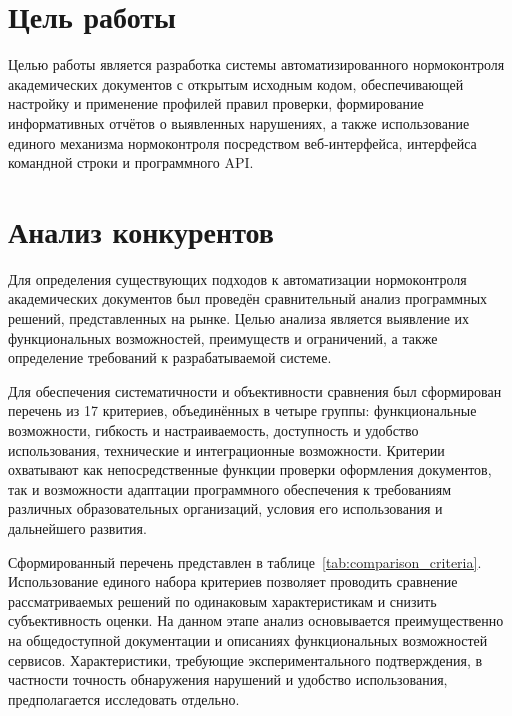 \documentclass[a4paper,14pt]{extarticle}
\begin{document}
\section{Цель работы}
Целью работы является разработка системы автоматизированного нормоконтроля академических документов с открытым исходным кодом,
обеспечивающей настройку и применение профилей правил проверки, формирование информативных отчётов о выявленных нарушениях,
а также использование единого механизма нормоконтроля посредством веб-интерфейса, интерфейса командной строки и программного API.

\section{Анализ конкурентов}
Для определения существующих подходов к автоматизации нормоконтроля академических документов был проведён сравнительный анализ программных решений, представленных на рынке. Целью анализа является выявление их функциональных возможностей, преимуществ и ограничений, а также определение требований к разрабатываемой системе.

Для обеспечения систематичности и объективности сравнения был сформирован перечень из 17 критериев, объединённых в четыре группы: функциональные возможности, гибкость и настраиваемость, доступность и удобство использования, технические и интеграционные возможности. Критерии охватывают как непосредственные функции проверки оформления документов, так и возможности адаптации программного обеспечения к требованиям различных образовательных организаций, условия его использования и дальнейшего развития.

Сформированный перечень представлен в таблице~\ref{tab:comparison_criteria}. Использование единого набора критериев позволяет проводить сравнение рассматриваемых решений по одинаковым характеристикам и снизить субъективность оценки. На данном этапе анализ основывается преимущественно на общедоступной документации и описаниях функциональных возможностей сервисов. Характеристики, требующие экспериментального подтверждения, в частности точность обнаружения нарушений и удобство использования, предполагается исследовать отдельно.


\begingroup

\newlength{\criteriaTableWidth}
\setlength{\criteriaTableWidth}{
    \dimexpr
    1cm + 4.2cm + 8cm
    + 6\tabcolsep
    + 4\arrayrulewidth
    \relax
}
\end{document}
